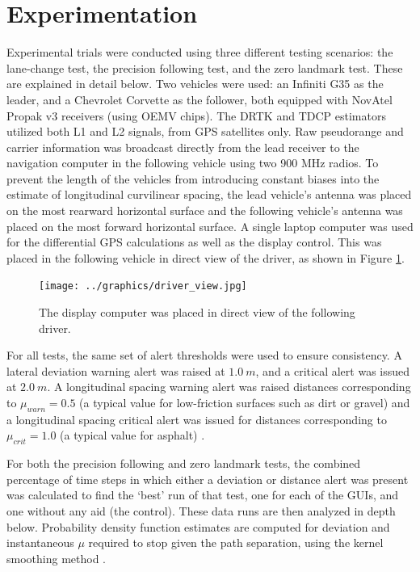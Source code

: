 \documentclass[twocolumn,10pt]{article}
\begin{document}

\section*{Experimentation}

  Experimental trials were conducted using three different testing scenarios: the lane-change test, the precision following test, and the zero landmark test.  These are explained in detail below.
  Two vehicles were used: an Infiniti G35 as the leader, and a Chevrolet Corvette as the follower, both equipped with NovAtel Propak v3 receivers (using OEMV chips).  The DRTK and TDCP estimators utilized both L1 and L2 signals, from GPS satellites only.  Raw pseudorange and carrier information was broadcast directly from the lead receiver to the navigation computer in the following vehicle using two 900 MHz radios.  To prevent the length of the vehicles from introducing constant biases into the estimate of longitudinal curvilinear spacing, the lead vehicle's antenna was placed on the most rearward horizontal surface and the following vehicle's antenna was placed on the most forward horizontal surface.
  A single laptop computer was used for the differential GPS calculations as well as the display control. This was placed in the following vehicle in direct view of the driver, as shown in Figure \ref{fig:driver_view}.

  \begin{figure}[ht] \centering
    \texttt{[image: ../graphics/driver\_view.jpg]}
    \caption{The display computer was placed in direct view of the following driver.}
    \label{fig:driver_view}
  \end{figure}

  For all tests, the same set of alert thresholds were used to ensure consistency. A lateral deviation warning alert was raised at $1.0~m$, and a critical alert was issued at $2.0~m$. A longitudinal spacing warning alert was raised distances corresponding to $\mu_{warn} = 0.5$ (a typical value for low-friction surfaces such as dirt or gravel) and a longitudinal spacing critical alert was issued for distances corresponding to $\mu_{crit}=1.0$ (a typical value for asphalt) \cite{mu}.

  For both the precision following and zero landmark tests, the combined percentage of time steps in which either a deviation or distance alert was present was calculated to find the `best' run of that test, one for each of the GUIs, and one without any aid (the control). These data runs are then analyzed in depth below.  Probability density function estimates are computed for deviation and instantaneous $\mu$ required to stop given the path separation, using the kernel smoothing method \cite{wand1995kernel}.
\end{document}
